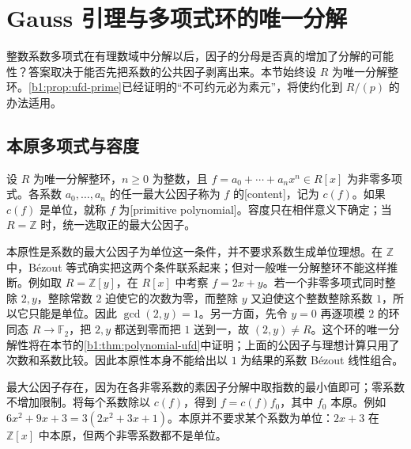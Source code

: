
\section{Gauss 引理与多项式环的唯一分解}
\label{b1:sec:1202}

%
%

整数系数多项式在有理数域中分解以后，因子的分母是否真的增加了分解的可能性？答案取决于能否先把系数的公共因子剥离出来。本节始终设 \(R\) 为唯一分解整环。\cref{b1:prop:ufd-prime}已经证明的“不可约元必为素元”，将使约化到 \(R/(p)\) 的办法适用。

\subsection{本原多项式与容度}
\label{b1:subsec:1202:01}

\begin{definition}\label{b1:def:polynomial-content}
	设 \(R\) 为唯一分解整环，\(n\geq0\) 为整数，且 \(f=a_0+\cdots+a_nx^n\in R[x]\) 为非零多项式。各系数 \(a_0,\ldots,a_n\) 的任一最大公因子称为 \(f\) 的[content]，记为 \(c(f)\)。如果 \(c(f)\) 是单位，就称 \(f\) 为[primitive polynomial]。容度只在相伴意义下确定；当 \(R=\mathbb Z\) 时，统一选取正的最大公因子。
\end{definition}

本原性是系数的最大公因子为单位这一条件，并不要求系数生成单位理想。在 \(\mathbb Z\) 中，Bézout 等式确实把这两个条件联系起来；但对一般唯一分解整环不能这样推断。例如取 \(R=\mathbb Z[y]\)，在 \(R[x]\) 中考察 \(f=2x+y\)。若一个非零多项式同时整除 \(2,y\)，整除常数 \(2\) 迫使它的次数为零，而整除 \(y\) 又迫使这个整数整除系数 \(1\)，所以它只能是单位。因此 \(\gcd(2,y)=1\)。另一方面，先令 \(y=0\) 再逐项模 \(2\) 的环同态 \(R\rightarrow\mathbb F_2\)，把 \(2,y\) 都送到零而把 \(1\) 送到一，故 \((2,y)\ne R\)。这个环的唯一分解性将在本节的\cref{b1:thm:polynomial-ufd}中证明；上面的公因子与理想计算只用了次数和系数比较。因此本原性本身不能给出以 \(1\) 为结果的系数 Bézout 线性组合。

\ProseParagraphBreak
最大公因子存在，因为在各非零系数的素因子分解中取指数的最小值即可；零系数不增加限制。将每个系数除以 \(c(f)\)，得到 \(f=c(f)f_0\)，其中 \(f_0\) 本原。例如 \(6x^2+9x+3=3(2x^2+3x+1)\)。本原并不要求某个系数为单位：\(2x+3\) 在 \(\mathbb Z[x]\) 中本原，但两个非零系数都不是单位。

